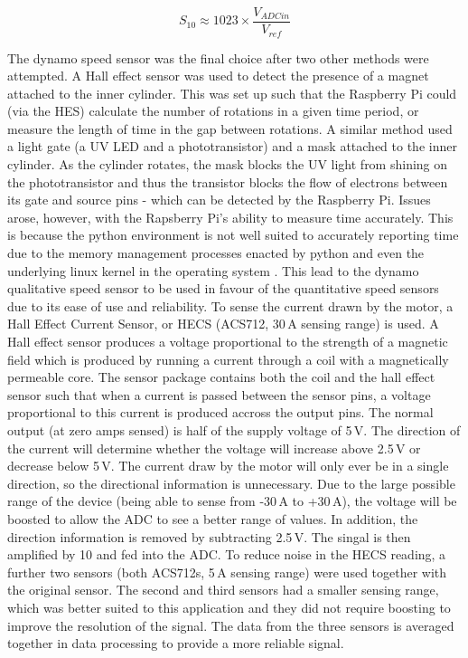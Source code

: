 \documentclass[twoside,a4]{report}
\def\br{\newline \newline \noindent}
\begin{document}
	\begin{equation}
	S_{10} \approx 1023 \times \frac{V_{ADCin}}{V_{ref}}
	\label{eqnadc}
	\end{equation}
	
	
	\noindent
	The dynamo speed sensor was the final choice after two other methods were attempted. A Hall effect sensor was used to detect the presence of a magnet attached to the inner cylinder. This was set up such that the Raspberry Pi could (via the HES) calculate the number of rotations in a given time period, or measure the length of time in the gap between rotations. A similar method used a light gate (a UV LED and a phototransistor) and a mask attached to the inner cylinder. As the cylinder rotates, the mask blocks the UV light from shining on the phototransistor and thus the transistor blocks the flow of electrons between its gate and source pins - which can be detected by the Raspberry Pi. Issues arose, however, with the Rapsberry Pi's ability to measure time accurately. This is because the python environment is not well suited to accurately reporting time due to the memory management processes enacted by python and even the underlying linux kernel in the operating system \cite{backrpibadrealtime}. This lead to the dynamo qualitative speed sensor to be used in favour of the quantitative speed sensors due to its ease of use and reliability.
	\br
	To sense the current drawn by the motor, a Hall Effect Current Sensor, or HECS (ACS712, 30\,A sensing range) is used. A Hall effect sensor produces a voltage proportional to the strength of a magnetic field which is produced by running a current through a coil with a magnetically permeable core. The sensor package contains both the coil and the hall effect sensor such that when a current is passed between the sensor pins, a voltage proportional to this current is produced accross the output pins. The normal output (at zero amps sensed) is half of the supply voltage of 5\,V. The direction of the current will determine whether the voltage will increase above 2.5\,V or decrease below 5\,V. The current draw by the motor will only ever be in a single direction, so the directional information is unnecessary. Due to the large possible range of the device (being able to sense from -30\,A to +30\,A), the voltage will be boosted to allow the ADC to see a better range of values. In addition, the direction information is removed by subtracting 2.5\,V. The singal is then amplified by 10 and fed into the ADC. 
	\br
	To reduce noise in the HECS reading, a further two sensors (both ACS712s, 5\,A sensing range) were used together with the original sensor. The second and third sensors had a smaller sensing range, which was better suited to this application and they did not require boosting to improve the resolution of the signal. The data from the three sensors is averaged together in data processing to provide a more reliable signal.
	
\end{document}
